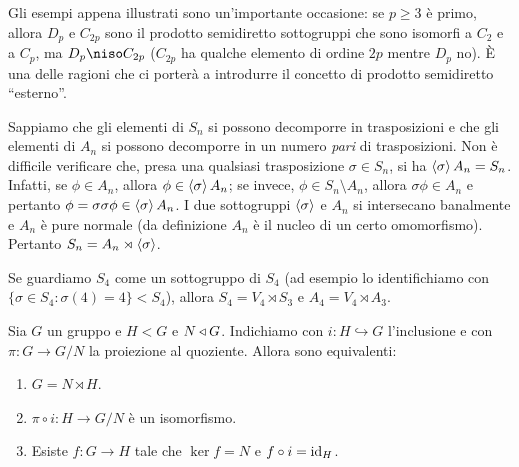 Gli esempi appena illustrati sono un'importante occasione: se $p \ge 3$ è primo, allora $D_p$ e $C_{2p}$ sono il prodotto semidiretto sottogruppi che sono isomorfi a $C_2$ e a $C_p$, ma $D_p \niso C_{2p}$ ($C_{2p}$ ha qualche elemento di ordine $2p$ mentre $D_p$ no). È una delle ragioni che ci porterà a introdurre il concetto di prodotto semidiretto \enquote{esterno}.

\begin{esem}
Sappiamo che gli elementi di $S_n$ si possono decomporre in trasposizioni e che gli elementi di $A_n$ si possono decomporre in un numero {\em pari} di trasposizioni. Non è difficile verificare che, presa una qualsiasi trasposizione $\sigma \in S_n$, si ha $\left\langle\sigma\right\rangle A_n = S_n$. Infatti, se $\phi \in A_n$, allora $\phi \in \left\langle\sigma\right\rangle A_n$; se invece, $\phi \in S_n \setminus A_n$, allora $\sigma \phi \in A_n$ e pertanto $\phi = \sigma \sigma \phi \in \left\langle\sigma\right\rangle A_n$. I due sottogruppi $\left\langle\sigma\right\rangle$ e $A_n$ si intersecano banalmente e $A_n$ è pure normale (da definizione $A_n$ è il nucleo di un certo omomorfismo). Pertanto $S_n = A_n \rtimes \left\langle\sigma\right\rangle$.
\end{esem}

\begin{esem}
Se guardiamo $S_4$ come un sottogruppo di $S_4$ (ad esempio lo identifichiamo con $\{\sigma\in S_4 : \sigma(4)=4\} < S_4$), allora $S_4=V_4\rtimes S_3$ e $A_4=V_4 \rtimes A_3$.
\end{esem}




\begin{prop}\label{prop:SemidirettoSottogruppiEquivalenti}
Sia $G$ un gruppo e $H < G$ e $N \triangleleft G$. Indichiamo con $i : H \hookrightarrow G$ l'inclusione e con $\pi : G \to G/N$ la proiezione al quoziente. Allora sono equivalenti:
\begin{enumerate}
\item $G = N \rtimes H$.
\item $\pi \circ i : H\to G/N$ è un isomorfismo.
\item Esiste $f : G \to H$ tale che $\ker f = N$ e $f \circ i = \mathrm{id}_H$.
\end{enumerate}
\end{prop}

